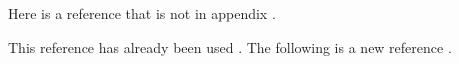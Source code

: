 \documentclass{article}
\begin{document}
  Here is a reference that is not in appendix \cite{thomas1998update}.

  \begin{toappendix}
    This reference has already been used \cite{thomas1998update}.
    The following is a new reference \cite{robertson1986graph}.
  \end{toappendix}

  
  
\end{document}
